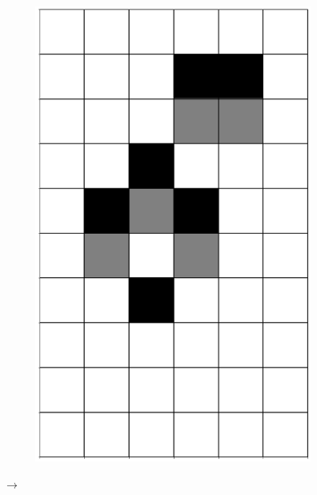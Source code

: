 \documentclass[12pt]{article}
\numberwithin{figure}{section} %
\begin{document}
\begin{figure}[H]
\begin{subfigure}{0.3\textwidth}
     \includegraphics[angle=270,width=\linewidth]{Section4/3.2}
     \subcaption{}
   \end{subfigure}
      {\LARGE$\xrightarrow{}$}
      \newline
   \setcounter{subfigure}{0}
   \begin{subfigure}{0.3\textwidth}
     \centering

\end{subfigure}
\end{figure}
\end{document}
